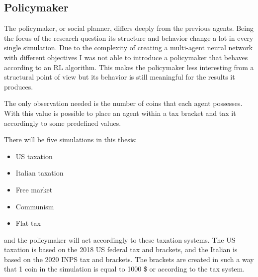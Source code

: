 \subsection{Policymaker}

The policymaker, or social planner, differs deeply from the previous agents. Being the focus of the research question its structure and behavior change a lot in every single simulation. Due to the complexity of creating a multi-agent neural network with different objectives I was not able to introduce a policymaker that behaves according to an RL algorithm. This makes the policymaker less interesting from a structural point of view but its behavior is still meaningful for the results it produces.

The only observation needed is the number of coins that each agent possesses. With this value is possible to place an agent within a tax bracket and tax it accordingly to some predefined values. 

There will be five simulations in this thesis: 

\begin{itemize}
    \item US taxation
    \item Italian taxation
    \item Free market
    \item Communism
    \item Flat tax
\end{itemize}

and the policymaker will act accordingly to these taxation systems. The US taxation is based on the 2018 US federal tax and brackets, and the Italian is based on the 2020 INPS tax and brackets. The brackets are created in such a way that 1 coin in the simulation is equal to 1000 \$ or   according to the tax system.  